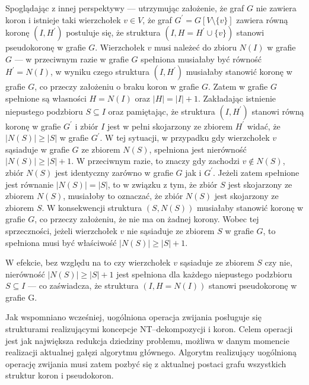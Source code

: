 {\begin{bproof}
    Spoglądając z innej perspektywy --- utrzymując założenie, że graf $G$ nie zawiera koron i istnieje taki wierzchołek $v \in V$, że graf $G^\prime= G[V \setminus \{v\}]$ zawiera równą koronę $(I, H^\prime)$ postuluje się, że struktura $(I, H=H^\prime \cup \{v\})$ stanowi pseudokoronę w grafie $G$.
    Wierzchołek $v$ musi należeć do zbioru $N(I)$ w grafie $G$ --- w przeciwnym razie w grafie $G$ spełniona musiałaby być równość $H^\prime=N(I)$, w wyniku czego struktura $(I, H^\prime)$ musiałaby stanowić koronę w grafie $G$, co przeczy założeniu o braku koron w grafie $G$.
    Zatem w grafie $G$ spełnione są własności $H=N(I)$ oraz $|H|=|I|+1$.
    Zakładając istnienie niepustego podzbioru $S \subseteq I$ oraz pamiętając, że struktura $(I, H^\prime)$ stanowi równą koronę w grafie $G^\prime$ i zbiór $I$ jest w pełni skojarzony ze zbiorem $H^\prime$ widać, że $|N(S)| \geq |S|$ w grafie $G^\prime$.
    W tej sytuacji, w przypadku gdy wierzchołek $v$ sąsiaduje w grafie $G$ ze zbiorem $N(S)$, spełniona jest nierówność $|N(S)| \geq |S| + 1$.
    W przeciwnym razie, to znaczy gdy zachodzi $v \notin N(S)$, zbiór $N(S)$ jest identyczny zarówno w grafie $G$ jak i $G^\prime$.
    Jeżeli zatem spełnione jest równanie $|N(S)|=|S|$, to w związku z tym, że zbiór $S$ jest skojarzony ze zbiorem $N(S)$, musiałoby to oznaczać, że zbiór $N(S)$ jest skojarzony ze zbiorem $S$.
    W konsekwencji struktura $(S, N(S))$ musiałaby stanowić koronę w grafie $G$, co przeczy założeniu, że nie ma on żadnej korony.
    Wobec tej sprzeczności, jeżeli wierzchołek $v$ nie sąsiaduje ze zbiorem $S$ w grafie $G$, to spełniona musi być właściwość $|N(S)| \geq |S| + 1$.

    W efekcie, bez względu na to czy wierzchołek $v$ sąsiaduje ze zbiorem $S$ czy nie, nierówność $|N(S)| \geq |S| + 1$ jest spełniona dla każdego niepustego podzbioru $S \subseteq I$ --- co zaświadcza, że struktura $(I, H=N(I))$ stanowi pseudokoronę w grafie G.
  \end{bproof}

  Jak wspomniano wcześniej, uogólniona operacja zwijania posługuje się strukturami realizującymi koncepcje NT--dekompozycji i koron.
  Celem operacji jest jak największa redukcja dziedziny problemu, możliwa w danym momencie realizacji aktualnej gałęzi algorytmu głównego.
  Algorytm realizujący uogólnioną operację zwijania musi zatem pozbyć się z aktualnej postaci grafu wszystkich struktur koron i pseudokoron.

}
